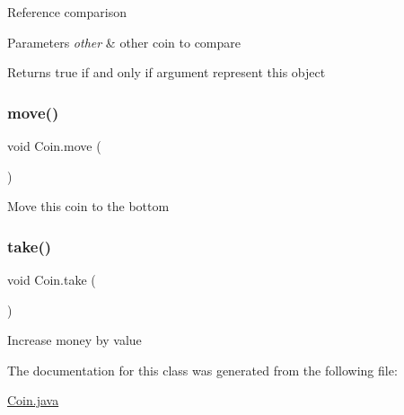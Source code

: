 Reference comparison 
\begin{DoxyParams}{Parameters}
{\em other} & other coin to compare \\
\hline
\end{DoxyParams}
\begin{DoxyReturn}{Returns}
true if and only if argument represent this object 
\end{DoxyReturn}
\mbox{\label{class_coin_a20c5586d6aca7b0c7cb224fcd0e40a23}} 
\subsubsection{\texorpdfstring{move()}{move()}}
{\footnotesize\ttfamily void Coin.\+move (\begin{DoxyParamCaption}{ }\end{DoxyParamCaption})\hspace{0.3cm}{\ttfamily [inline]}}

Move this coin to the bottom \mbox{\label{class_coin_ab46d9ebd197256a75e0861d07c61c80f}} 
\subsubsection{\texorpdfstring{take()}{take()}}
{\footnotesize\ttfamily void Coin.\+take (\begin{DoxyParamCaption}{ }\end{DoxyParamCaption})\hspace{0.3cm}{\ttfamily [inline]}}

Increase money by value 

The documentation for this class was generated from the following file\+:\begin{DoxyCompactItemize}
\item 
\mbox{\hyperlink{_coin_8java}{Coin.\+java}}\end{DoxyCompactItemize}
